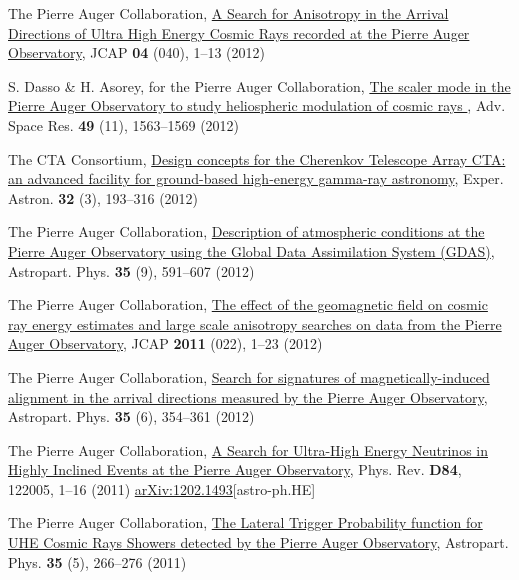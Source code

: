 \begin{etaremune}
\item {}The Pierre Auger Collaboration, 
\href{http://dx.doi.org/10.1088/1475-7516/2012/04/040}{{A Search for
Anisotropy in the Arrival Directions of Ultra High Energy Cosmic Rays recorded
at the Pierre Auger Observatory}}, JCAP {\bf{04}} (040), 1--13 (2012)

\item {}S. Dasso \& H. Asorey, for the Pierre Auger Collaboration,
\href{http://dx.doi.org/10.1016/j.asr.2011.12.028}{{ The scaler mode in
the Pierre Auger Observatory to study heliospheric modulation of cosmic rays
}}, Adv. Space Res. {\bf{49}} (11), 1563--1569 (2012)

\item {}The CTA Consortium,
\href{http://dx.doi.org/10.1007/s10686-011-9247-0}{{Design concepts for
the Cherenkov Telescope Array CTA: an advanced facility for ground-based
high-energy gamma-ray astronomy}}, Exper. Astron. {\bf{32}} (3), 193--316
(2012)

\item {}The Pierre Auger Collaboration, 
\href{http://dx.doi.org/10.1016/j.astropartphys.2011.12.002}{{Description
of atmospheric conditions at the Pierre Auger Observatory using the Global Data
Assimilation System (GDAS)}}, Astropart. Phys. {\bf{35}} (9), 591--607 (2012)

\item {}The Pierre Auger Collaboration, 
\href{http://dx.doi.org/10.1088/1475-7516/2011/11/022}{{The effect of the
geomagnetic field on cosmic ray energy estimates and large scale anisotropy
searches on data from the Pierre Auger Observatory}}, JCAP {\bf{2011}} (022),
1--23 (2012)

\item {}The Pierre Auger Collaboration, 
\href{http://dx.doi.org/10.1016/j.astropartphys.2011.10.004}{{Search for
signatures of magnetically-induced alignment in the arrival directions measured
by the Pierre Auger Observatory}}, Astropart. Phys. {\bf{35}} (6), 354--361
(2012)

\item {}The Pierre Auger Collaboration,
\href{http://dx.doi.org/10.1016/10.1103/PhysRevD.84.122005}{{A Search for
Ultra-High Energy Neutrinos in Highly Inclined Events at the Pierre Auger
Observatory}}, Phys.  Rev. {\bf D84}, 122005, 1--16 (2011)
\href{http://arxiv.org/abs/1202.1493}{arXiv:1202.1493}[astro-ph.HE]

\item {}The Pierre Auger Collaboration, 
\href{http://dx.doi.org/10.1016/j.astropartphys.2011.08.001}{{The Lateral
Trigger Probability function for UHE Cosmic Rays Showers detected by the Pierre
Auger Observatory}}, Astropart. Phys. {\bf{35}} (5), 266--276 (2011)


\end{etaremune}
